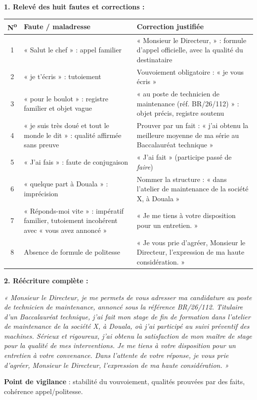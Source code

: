 \documentclass[11pt]{article}
\begin{document}
\begin{corrige}
\textbf{1. Relevé des huit fautes et corrections :}
\begin{center}
\begin{tabularx}{\linewidth}{|c|X|X|}\hline
\textbf{N\textsuperscript{o}} & \textbf{Faute / maladresse} & \textbf{Correction justifiée} \\ \hline
1 & « Salut le chef » : appel familier & « Monsieur le Directeur, » : formule d'appel officielle, avec la qualité du destinataire \\ \hline
2 & « je t'écris » : tutoiement & Vouvoiement obligatoire : « je vous écris » \\ \hline
3 & « pour le boulot » : registre familier et objet vague & « au poste de technicien de maintenance (réf. BR/26/112) » : objet précis, registre soutenu \\ \hline
4 & « je suis très doué et tout le monde le dit » : qualité affirmée sans preuve & Prouver par un fait : « j'ai obtenu la meilleure moyenne de ma série au Baccalauréat technique » \\ \hline
5 & « J'ai fais » : faute de conjugaison & « J'ai fait » (participe passé de \emph{faire}) \\ \hline
6 & « quelque part à Douala » : imprécision & Nommer la structure : « dans l'atelier de maintenance de la société X, à Douala » \\ \hline
7 & « Réponds-moi vite » : impératif familier, tutoiement incohérent avec « vous avez annoncé » & « Je me tiens à votre disposition pour un entretien. » \\ \hline
8 & Absence de formule de politesse & « Je vous prie d'agréer, Monsieur le Directeur, l'expression de ma haute considération. » \\ \hline
\end{tabularx}
\end{center}
\textbf{2. Réécriture complète :}
\begin{center}
\emph{« Monsieur le Directeur, je me permets de vous adresser ma candidature au poste de technicien de maintenance, annoncé sous la référence BR/26/112. Titulaire d'un Baccalauréat technique, j'ai fait mon stage de fin de formation dans l'atelier de maintenance de la société X, à Douala, où j'ai participé au suivi préventif des machines. Sérieux et rigoureux, j'ai obtenu la satisfaction de mon maître de stage pour la qualité de mes interventions. Je me tiens à votre disposition pour un entretien à votre convenance. Dans l'attente de votre réponse, je vous prie d'agréer, Monsieur le Directeur, l'expression de ma haute considération. »}
\end{center}
\textbf{Point de vigilance} : stabilité du vouvoiement, qualités prouvées par des faits, cohérence appel/politesse.
\end{corrige}
\end{document}
